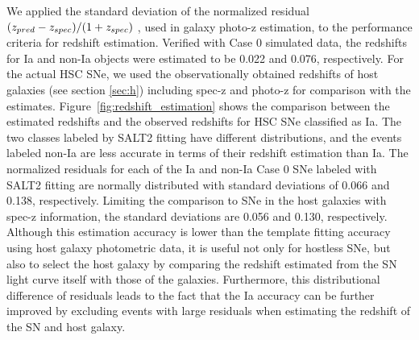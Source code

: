 \documentclass[useamsfonts]{pasj01}
\begin{document}
We applied the standard deviation of the normalized residual $(z_{\rm pred}-z_{\rm spec})/(1+z_{\rm spec})$ \citep{Salvato_2009,Salvato_2019}, used in galaxy photo-z estimation, to the performance criteria for redshift estimation.
Verified with Case 0 simulated data, the redshifts for Ia and non-Ia objects were estimated to be 0.022 and 0.076, respectively.
For the actual HSC SNe, we used the observationally obtained redshifts of host galaxies (see section \ref{sec:h}) including spec-z and photo-z for comparison with the estimates.
Figure\ \ref{fig:redshift_estimation} shows the comparison between the estimated redshifts and the observed redshifts for HSC SNe classified as Ia.
The two classes labeled by SALT2 fitting have different distributions, and the events labeled non-Ia are less accurate in terms of their redshift estimation than Ia.
The normalized residuals for each of the Ia and non-Ia Case 0 SNe labeled with SALT2 fitting are normally distributed with standard deviations of 0.066 and 0.138, respectively.
Limiting the comparison to SNe in the host galaxies with spec-z information, the standard deviations are 0.056 and 0.130, respectively.
Although this estimation accuracy is lower than the template fitting accuracy using host galaxy photometric data, it is useful not only for hostless SNe, but also to select the host galaxy by comparing the redshift estimated from the SN light curve itself with those of the galaxies.
Furthermore, this distributional difference of residuals leads to the fact that the Ia accuracy can be further improved by excluding events with large residuals when estimating the redshift of the SN and host galaxy.
%
\end{document}
